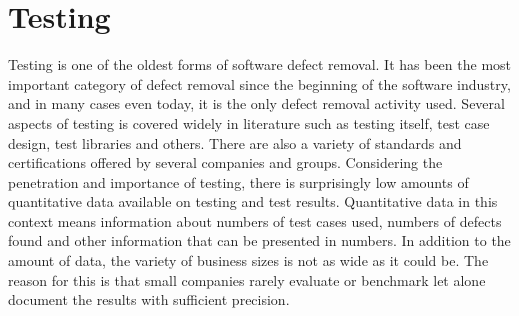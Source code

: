 
 \section{Testing}

Testing is one of the oldest forms of software defect removal. It has been the most important category of defect removal since the beginning of the software industry, and in many cases even today, it is the only defect removal activity used. Several aspects of testing is covered widely in literature such as testing itself, test case design, test libraries and others. There are also a variety of standards and certifications offered by several companies and groups. Considering the penetration and importance of testing, there is surprisingly low amounts of quantitative data available on testing and test results. Quantitative data in this context means information about numbers of test cases used, numbers of defects found and other information that can be presented in numbers. In addition to the amount of data, the variety of business sizes is not as wide as it could be. The reason for this is that small companies rarely evaluate or benchmark let alone document the results with sufficient precision.




% 





% 
% 
% 



